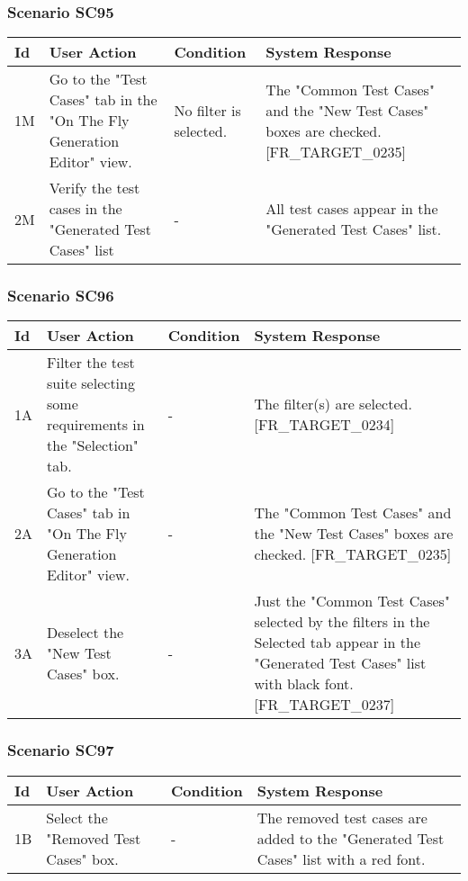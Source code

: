 \documentclass[a4paper,11pt]{article}
\newcommand{\bl}{\\ \hline}
\begin{document}
\subsubsection*{Scenario SC95}
\begin{tabular}{|p{0.4in}|p{1.5in}|p{1.5in}|p{1.5in}|}
\hline
Id & User Action & Condition & System Response \bl 
1M & Go to the "Test Cases" tab in the "On The Fly Generation
						Editor" view. & No filter is selected. & The "Common Test Cases" and the "New Test Cases" boxes
						are checked. [FR_TARGET_0235] \bl
2M & Verify the test cases in the "Generated Test Cases" list
					 & - & All test cases appear in the "Generated Test Cases" list.
					\bl
\end{tabular}
\subsubsection*{Scenario SC96}
\begin{tabular}{|p{0.4in}|p{1.5in}|p{1.5in}|p{1.5in}|}
\hline
Id & User Action & Condition & System Response \bl 
1A & Filter the test suite selecting some requirements in the
						"Selection" tab.  & - & The filter(s) are selected. [FR_TARGET_0234]\bl
2A & Go to the "Test Cases" tab in "On The Fly Generation
						Editor" view. & - & The "Common Test Cases" and the "New Test Cases" boxes
						are checked. [FR_TARGET_0235] \bl
3A & Deselect the "New Test Cases" box. & - & Just the "Common Test Cases" selected by the filters in
						the Selected tab appear in the "Generated Test Cases" list with
						black font. [FR_TARGET_0237]\bl
\end{tabular}
\subsubsection*{Scenario SC97}
\begin{tabular}{|p{0.4in}|p{1.5in}|p{1.5in}|p{1.5in}|}
\hline
Id & User Action & Condition & System Response \bl 
1B & Select the "Removed Test Cases" box. & - & The removed test cases are added to the "Generated Test
						Cases" list with a red font.\bl
\end{tabular}
\end{document}
